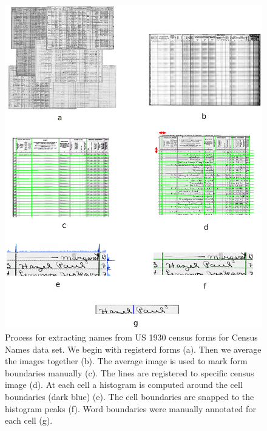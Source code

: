 \documentclass[ms,electronic,twosidetoc,letterpaper,chaptercenter,parttop,lol,lof,lot]{byumsphd}
\begin{document}
\begin{figure}
    \centering
    \includegraphics[width=.9\textwidth]{makenames}
    \caption{Process for extracting names from US 1930 census forms for Census Names data set. We begin with registerd forms (a). Then we average the images together (b). The average image is used to mark form boundaries manually (c). The lines are registered to specific census image (d). At each cell a histogram is computed around the cell boundaries (dark blue) (e). The cell boundaries are snapped to the histogram peaks (f). Word boundaries were manually annotated for each cell (g).}
    \label{fig:makenames}
\end{figure}
\end{document}
